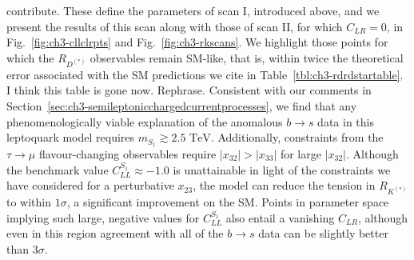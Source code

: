 contribute. These define the parameters of scan I, introduced above, and we
present the results of this scan along with those of scan II, for which
$C_{LR} = 0$, in Fig.~\ref{fig:ch3-cllclrpts} and Fig.~\ref{fig:ch3-rkscans}. We
highlight those points for which the $R_{D^{(*)}}$ observables remain SM-like,
that is, within twice the theoretical error associated with the SM predictions
we cite in Table~\ref{tbl:ch3-rdrdstartable}. {\color{red}I think this table is
  gone now. Rephrase.} Consistent with our comments in
Section~\ref{sec:ch3-semileptonicchargedcurrentprocesses}, we find that any
phenomenologically viable explanation of the anomalous $b \to s$ data in this
leptoquark model requires $m_{S_{1}} \gtrsim 2.5 \text{ TeV}$. Additionally,
constraints from the $\tau \to \mu$ flavour-changing observables require
$|x_{32}| > |x_{33}|$ for large $|x_{32}|$. Although the benchmark value
$C_{LL}^{S_{1}} \approx -1.0$ is unattainable in light of the constraints we
have considered for a perturbative $x_{23}$, the model can reduce the tension in
$R_{K^{(*)}}$ to within $1 \sigma$, a significant improvement on the SM. Points
in parameter space implying such large, negative values for $C_{LL}^{S_{1}}$
also entail a vanishing $C_{LR}$, although even in this region agreement with
all of the $b \to s$ data can be slightly better than $3\sigma$.

